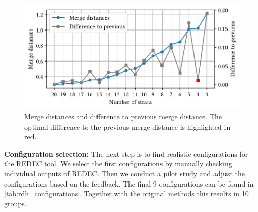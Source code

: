 \documentclass[%
class=scrreprt,
chapterprefix=false,%
open=right,%
twoside=true,%
paper=a4,%
logofile={Logo\_zentral\_farbig\_EN.png},%
thesistype=master,%
UKenglish,%
]{se2thesis}
\theoremstyle{definition}
\newcommand{\rdh}{REDEC\xspace}
\begin{document}
	\begin{figure}[tb]
		\centering
		\includegraphics[width=\textwidth]{img/strata_merge_distances.pdf}
		\caption{Merge distances and difference to previous merge distance. The optimal difference to the previous merge distance is highlighted in red.} 
		\label{fig:strata_merge_distances}
	\end{figure}
	
	\textbf{Configuration selection:} The next step is to find realistic configurations for the \rdh tool. We select the first configurations by manually checking individual outputs of \rdh. Then we conduct a pilot study and adjust the configurations based on the feedback.
	The final 9 configurations can be found in \autoref{tab:rdh_configurations}. Together with the original methods this results in 10 groups.
	
		

	
%
	
\end{document}
